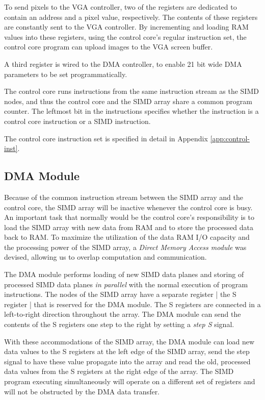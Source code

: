
To send pixels to the \ac{VGA} controller, two of the registers are dedicated to
contain an address and a pixel value, respectively. The contents of these
registers are constantly sent to the \ac{VGA} controller. By incrementing and
loading \ac{RAM} values into these registers, using the control core's regular
instruction set, the control core program can upload images to the \ac{VGA}
screen buffer.

A third register is wired to the \ac{DMA} controller, to enable 21 bit wide
\ac{DMA} parameters to be set programmatically.

The control core runs instructions from the same instruction stream as the
\ac{SIMD} nodes, and thus the control core and the \ac{SIMD} array share a
common program counter. The leftmost bit in the instructions specifies whether
the instruction is a control core instruction or a \ac{SIMD} instruction.

The control core instruction set is specified in detail in Appendix
\ref{app:control-inst}.

\subsection{DMA Module}

Because of the common instruction stream between the \ac{SIMD} array and the
control core, the \ac{SIMD} array will be inactive whenever the control core is
busy. An important task that normally would be the control core's responsibility
is to load the \ac{SIMD} array with new data from \ac{RAM} and to store the
processed data back to \ac{RAM}. To maximize the utilization of the data
\ac{RAM} \ac{I/O} capacity and the processing power of the \ac{SIMD} array, a
\emph{Direct Memory Access module} was devised, allowing us to overlap
computation and communication.

The \ac{DMA} module performs loading of new \ac{SIMD} data planes and storing of
processed \ac{SIMD} data planes \emph{in parallel} with the normal execution of
program instructions. The nodes of the \ac{SIMD} array have a separate register
| the S register | that is reserved
for the \ac{DMA} module. The S registers are connected in a left-to-right
direction throughout the array. The \ac{DMA} module can send the contents of the
S registers one step to the right by setting a \emph{step S} signal.

With these accommodations of the \ac{SIMD} array, the \ac{DMA} module can load
new data values to the S registers at the left edge of the \ac{SIMD} array, send
the step signal to have these value propagate into the array and read the old,
processed data values from the S registers at the right edge of the array. The
\ac{SIMD} program executing simultaneously will operate on a different set of
registers and will not be obstructed by the \ac{DMA} data transfer.

